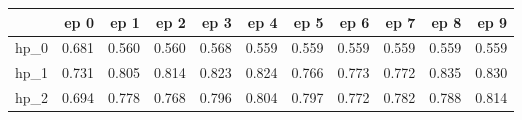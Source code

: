 \begin{tabular}{lrrrrrrrrrr}
\toprule
{} &   ep 0 &   ep 1 &   ep 2 &   ep 3 &   ep 4 &   ep 5 &   ep 6 &   ep 7 &   ep 8 &   ep 9 \\
\midrule
hp\_0 &  0.681 &  0.560 &  0.560 &  0.568 &  0.559 &  0.559 &  0.559 &  0.559 &  0.559 &  0.559 \\
hp\_1 &  0.731 &  0.805 &  0.814 &  0.823 &  0.824 &  0.766 &  0.773 &  0.772 &  0.835 &  0.830 \\
hp\_2 &  0.694 &  0.778 &  0.768 &  0.796 &  0.804 &  0.797 &  0.772 &  0.782 &  0.788 &  0.814 \\
\bottomrule
\end{tabular}
